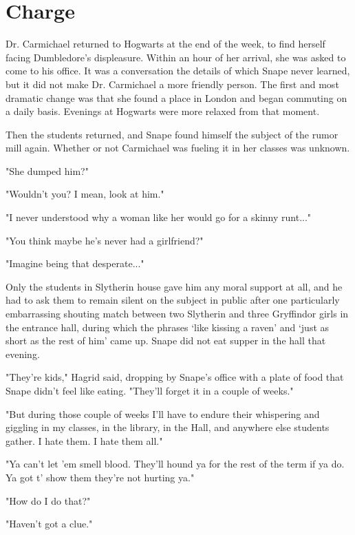 
\chapter{Charge}

Dr. Carmichael returned to Hogwarts at the end of the week, to find herself facing Dumbledore's displeasure. Within an hour of her arrival, she was asked to come to his office. It was a conversation the details of which Snape never learned, but it did not make Dr. Carmichael a more friendly person. The first and most dramatic change was that she found a place in London and began commuting on a daily basis. Evenings at Hogwarts were more relaxed from that moment.

Then the students returned, and Snape found himself the subject of the rumor mill again. Whether or not Carmichael was fueling it in her classes was unknown.

"She dumped him?"

"Wouldn't you? I mean, look at him."

"I never understood why a woman like her would go for a skinny runt..."

"You think maybe he's never had a girlfriend?"

"Imagine being that desperate..."

Only the students in Slytherin house gave him any moral support at all, and he had to ask them to remain silent on the subject in public after one particularly embarrassing shouting match between two Slytherin and three Gryffindor girls in the entrance hall, during which the phrases `like kissing a raven' and `just as short as the rest of him' came up. Snape did not eat supper in the hall that evening.

"They're kids," Hagrid said, dropping by Snape's office with a plate of food that Snape didn't feel like eating. "They'll forget it in a couple of weeks."

"But during those couple of weeks I'll have to endure their whispering and giggling in my classes, in the library, in the Hall, and anywhere else students gather. I hate them. I hate them all."

"Ya can't let 'em smell blood. They'll hound ya for the rest of the term if ya do. Ya got t' show them they're not hurting ya."

"How do I do that?"

"Haven't got a clue."

